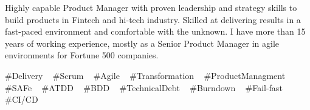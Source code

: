 

\begin{cvparagraph}


Highly capable Product Manager with proven leadership and strategy skills to build products in Fintech and hi-tech industry. Skilled at delivering results in a fast-paced environment and comfortable with the unknown. I have more than 15 years of working experience, mostly as a Senior Product Manager in agile environments for Fortune 500 companies.



\end{cvparagraph}
\begin{cvtechnologies}
 \#Delivery  ~
 \#Scrum ~
 \#Agile ~
 \#Transformation ~
 \#ProductManagment ~
 \#SAFe ~
 \#ATDD ~
  \#BDD ~
  \#TechnicalDebt ~
  \#Burndown ~
  \#Fail-fast ~
  \#CI/CD ~
 \end{cvtechnologies}
